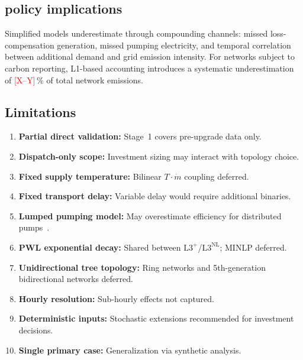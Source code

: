 \documentclass[review,3p]{elsarticle}
\newcommand{\placeholder}[1]{\textcolor{red}{[#1]}}
\newcommand{\Lplus}{\mathrm{L3}^{+}}
\newcommand{\Lnl}{\mathrm{L3}^{\mathrm{NL}}}
\begin{document}
\subsection{ policy implications}
\label{sec:disc_co2}

Simplified models underestimate  through compounding
channels: missed loss-compensation generation, missed pumping
electricity, and temporal correlation between additional demand and
grid emission intensity. For networks subject to carbon reporting,
L1-based accounting introduces a systematic underestimation of
\placeholder{X--Y}\,\% of total network emissions.

\subsection{Limitations}
\label{sec:discussion_limitations}

\begin{enumerate}[nosep]
  \item \textbf{Partial direct validation:} Stage~1 covers
        pre-upgrade data only.
  \item \textbf{Dispatch-only scope:} Investment sizing may interact
        with topology choice.
  \item \textbf{Fixed supply temperature:} Bilinear
        $T \cdot \dot{m}$ coupling deferred.
  \item \textbf{Fixed transport delay:} Variable delay would require
        additional binaries.
  \item \textbf{Lumped pumping model:} May overestimate efficiency for
        distributed pumps~\cite{Hari2024}.
  \item \textbf{PWL exponential decay:} Shared between
        $\Lplus$/$\Lnl$; MINLP deferred.
  \item \textbf{Unidirectional tree topology:} Ring networks and
        5th-generation bidirectional networks deferred.
  \item \textbf{Hourly resolution:} Sub-hourly effects not captured.
  \item \textbf{Deterministic inputs:} Stochastic extensions
        recommended for investment decisions.
  \item \textbf{Single primary case:} Generalization via synthetic
        analysis.
\end{enumerate}

\end{document}
